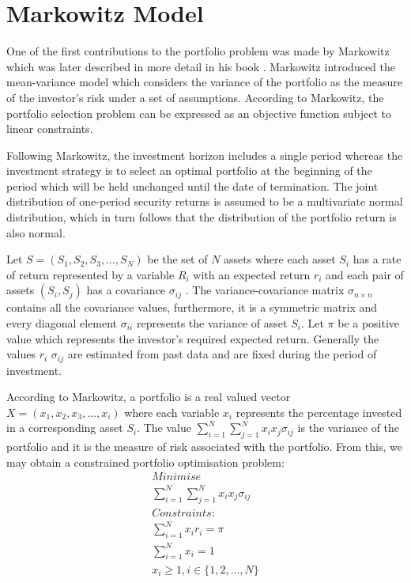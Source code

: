 \documentclass{pdfmx4020}
\begin{document}
  \section{Markowitz Model} %
  \label{sec:markowitz_model}
    One of the first contributions to the portfolio problem was made by Markowitz \cite{marko1} which was later described in more detail in his book \cite{marko2}. Markowitz introduced the mean-variance model which considers the variance of the portfolio as the measure of the investor's risk under a set of assumptions. According to Markowitz, the portfolio selection problem can be expressed as an objective function subject to linear constraints. 

    Following Markowitz, the investment horizon includes a single period whereas the investment strategy is to select an optimal portfolio at the beginning of the period which will be held unchanged until the date of termination. The joint distribution of one-period security returns is assumed to be a multivariate normal distribution, which in turn follows that the distribution of the portfolio return is also normal. 

    Let $S = (S_1,S_2,S_3, \dots , S_N)$ be the set of $N$ assets where each asset $S_i$ has a rate of return represented by a variable $R_i$ with an expected return $r_i$ and each pair of assets $(S_i,S_j)$ has a covariance $\sigma_{ij}$ . The variance-covariance matrix $\sigma_{n\times n}$ contains all the covariance values, furthermore, it is a symmetric matrix and every diagonal element $\sigma_{ii}$ represents the variance of asset $S_i$. Let $\pi$ be a positive value which represents the investor's required expected return. Generally the values $r_i$ $\sigma_{ij}$ are estimated from past data and are fixed during the period of investment. 

    According to Markowitz, a portfolio is a real valued vector $X = (x_1,x_2,x_3, \dots ,x_i)$ where each variable $x_i$ represents the percentage invested in a corresponding asset $S_i$. The value $\sum\limits_{i=1}^N \sum\limits_{j=1}^N x_i x_j \sigma_{ij}$ is the variance of the portfolio and it is the measure of risk associated with the portfolio. From this, we may obtain a constrained portfolio optimisation problem: 
    \begin{equation}
      \begin{split}
        Minimise \\
        \sum\limits_{i=1}^N \sum\limits_{j=1}^N x_i x_j \sigma_{ij} \\
        Constraints:\\
        \sum\limits_{i=1}^N x_i r_i = \pi \\
        \sum\limits_{i=1}^N x_i = 1 \\
        x_i \geq 1, i \in \{1,2,\dots,N\}
      \end{split}
    \end{equation}
\end{document}
